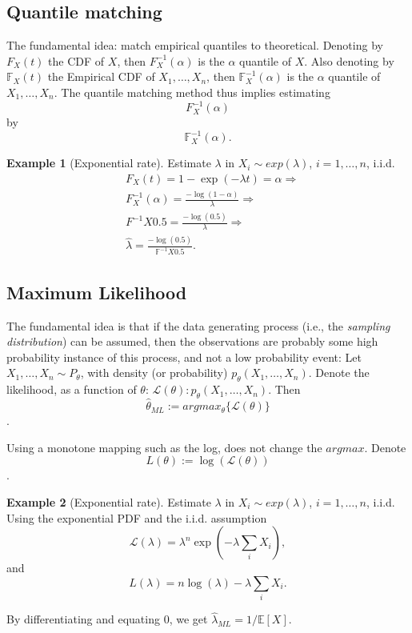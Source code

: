 \documentclass[12pt,a4paper]{article}
\theoremstyle{plain}
\theoremstyle{definition}
\newtheorem{example}{Example}
\newcommand{\expectn}[1]{\mathbb{E}\left[#1\right]}
\newcommand{\cdf}{F}
\newcommand{\cdfn}{\mathbb{F}}
\newcommand{\icdf}{F^{-1}}
\newcommand{\icdfn}{\mathbb{F}^{-1}}
\newcommand{\lik}{\mathcal{L}}
\newcommand{\loglik}{L}
\begin{document}
\subsection{Quantile matching}
\label{sec:quantiles}

The fundamental idea: match empirical quantiles to theoretical. 
Denoting by $\cdf_X(t)$ the CDF of $X$, then $\icdf_X(\alpha)$ is the $\alpha$ quantile of $X$.
Also denoting by $\cdfn_X(t)$ the Empirical CDF of $X_1,\dots, X_n$, then $\icdfn_X(\alpha)$ is the $\alpha$ quantile of $X_1,\dots, X_n$.
The quantile matching method thus implies estimating
$$ \icdf_X(\alpha)   $$
by 
$$ \icdfn_X(\alpha)  . $$

\begin{example}[Exponential rate]
Estimate $\lambda$ in $X_i \sim exp(\lambda)$, $i=1,\dots,n$, i.i.d.
\begin{align*}
	& \cdf_X(t) = 1-\exp(-\lambda t) = \alpha \Rightarrow \\
	& \icdf_X(\alpha) = \frac{-\log(1-\alpha)}{\lambda} \Rightarrow \\
	& \icdf{X}{0.5} = \frac{-\log(0.5)}{\lambda} \Rightarrow \\
	& \hat{\lambda} = \frac{-\log(0.5)}{\icdfn{X}{0.5}}.
\end{align*}

\end{example}


\subsection{Maximum Likelihood}
\label{sec:ml}

The fundamental idea is that if the data generating process (i.e., the \emph{sampling distribution}) can be assumed, then the observations are probably some high probability instance of this process, and not a low probability event:
Let $X_1,\dots,X_n \sim P_\theta$, with density (or probability) $p_\theta(X_1,\dots,X_n)$.
Denote the likelihood, as a function of $\theta$: $\lik(\theta): p_\theta(X_1,\dots,X_n)$.
Then $$\hat{\theta}_{ML}:= argmax_{\theta}\{ \lik(\theta) \}$$.

Using a monotone mapping such as the log, does not change the $argmax$. 
Denote $$\loglik(\theta):=\log(\lik(\theta))$$.

 
\begin{example}[Exponential rate]

Estimate $\lambda$ in $X_i \sim exp(\lambda)$, $i=1,\dots,n$, i.i.d.
Using the exponential PDF and the i.i.d. assumption
$$ \lik(\lambda) = \lambda^n \exp(-\lambda \sum_i X_i), $$
and 
$$ \loglik(\lambda) = n \log(\lambda) -\lambda \sum_i X_i. $$

By differentiating and equating $0$, we get $\hat{\lambda}_{ML}=1/\expectn{X}$.

\end{example}
\end{document}
